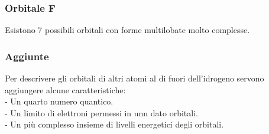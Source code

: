 \subsubsection{Orbitale F}
Esistono 7 possibili orbitali con forme multilobate molto complesse.
\subsubsection{Aggiunte}
Per descrivere gli orbitali di altri atomi al di fuori dell'idrogeno servono aggiungere alcune caratteristiche:\\
\tab- Un quarto numero quantico.\\
\tab- Un limito di elettroni permessi in unn dato orbitali.\\
\tab- Un più complesso insieme di livelli energetici degli orbitali.
